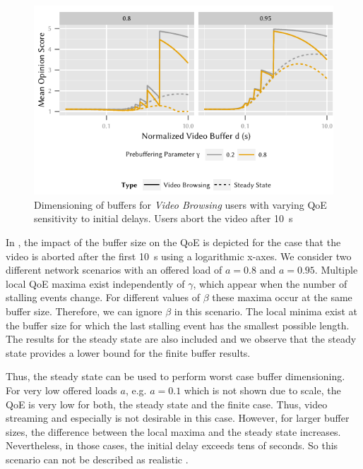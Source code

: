 \begin{figure}
  \centering
  \includegraphics{application/qoe_user_behaviour/user_scenarios/figures/video_browsing}
  \caption{Dimensioning of buffers for \emph{Video Browsing} users with varying \gls{QoE} sensitivity to initial delays. Users abort the video after \SI{10}{\second}}
  \label{fig:application:qoe_user_behaviour:typical_user_scenarios:browsing:video_browsing}
\end{figure}

In , the impact of the buffer size on the \gls{QoE} is depicted for the case that the video is aborted after the first \SI{10}{\second} using a logarithmic x-axes. 
We consider two different network scenarios with an offered load of \(a = 0.8\) and \(a = 0.95\).
Multiple local QoE maxima exist independently of \(\gamma\), which appear when the number of stalling events change. 
For different values of \(\beta\) these maxima occur at the same buffer size.
Therefore, we can ignore \(\beta\) in this scenario. 
The local minima exist at the buffer size for which the last stalling event has the smallest possible length. 
The results for the steady state are also included and we observe that the steady state provides a lower bound for the finite buffer results.

Thus, the steady state can be used to perform worst case buffer dimensioning.
For very low offered loads \(a\), e.g. \(a = 0.1\) which is not shown due to scale, the \gls{QoE} is very low for both, the steady state and the finite case. 
Thus, video streaming and especially \videoBrowsing is not desirable in this case. 
However, for larger buffer sizes, the difference between the local maxima and the steady state increases. 
Nevertheless, in those cases, the initial delay exceeds tens of seconds.
So this scenario can not be described as realistic \videoBrowsing.

